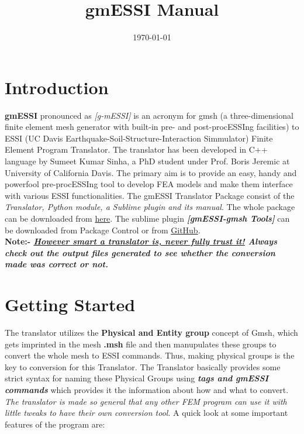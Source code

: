 \documentclass[11pt]{article}
\title{gmESSI Manual}
\date{\today}
\begin{document}
\maketitle

\tableofcontents
\newpage



\section{Introduction} 


\textbf{gmESSI}  pronounced  as  \textit{[g-mESSI]}  is  an  acronym for gmsh (a
three-dimensional   finite   element  mesh  generator  with  built-in  pre-  and
post-procESSIng        facilities)        to        ESSI        (UC        Davis
Earthquake-Soil-Structure-Interaction   Simmulator)   Finite   Element   Program
Translator.  The  translator  has been developed in C++ language by Sumeet Kumar
Sinha,  a  PhD  student  under  Prof.  Boris Jeremic at University of California
Davis. The primary aim is to provide an easy, handy and powerfool pre-procESSIng
tool   to  develop  FEA  models  and  make  them  interface  with  various  ESSI
functionalities.    The    gmESSI    Translator    Package    consist   of   the
\textit{Translator,  Python  module, a Sublime plugin and its manual}. The whole
package  can be downloaded from \href{https://github.com/SumeetSinha/gmESSI}
{here}. The sublime plugin  \textit{\textbf{[gmESSI-gmsh Tools]}} can   be   
downloaded   from  Package  Control  or  from
\href{https://github.com/SumeetSinha/gmESSI-SublimePlugin}{GitHub}.\\ 

\textbf{Note:-  \textit{\underline{However  smart  a translator is, never fully
trust it!} Always  check  out the output files generated to see whether the
conversion made was correct or not.}}


\section{Getting Started} 

The  translator utilizes the \textbf{Physical and Entity group} concept of Gmsh,
which  gets  imprinted in the mesh \textbf{.msh} file and then manupulates these
groups  to convert the whole mesh to ESSI commands. Thus, making physical groups
is  the key to conversion for this Translator. The Translator basically provides
some  strict  syntax for naming these Physical Groups using \textbf{\textit{tags
and  gmESSI  commands}}  which provides it the information about how and what to
convert.  \textit{The  translator  is made so general that any other FEM program
can  use  it with little tweaks to have their own conversion tool}. A quick look
at some important features of the program are:
\end{document}
